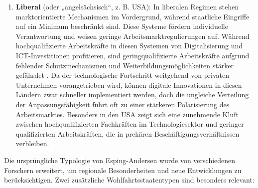 \begin{enumerate}
    \item \textbf{Liberal} (oder „angelsächsisch“, z. B. USA): In liberalen Regimen 
    stehen marktorientierte Mechanismen im Vordergrund, während staatliche Eingriffe auf ein 
    Minimum beschränkt sind. Diese Systeme fördern individuelle Verantwortung und weisen 
    geringe Arbeitsmarktregulierungen auf. Während hochqualifizierte Arbeitskräfte in diesen 
    Systemen von Digitalisierung und \ac{ICT}-Investitionen profitieren, sind 
    geringqualifizierte Arbeitskräfte aufgrund fehlender Schutzmechanismen und 
    Weiterbildungsmöglichkeiten stärker gefährdet \parencite[vgl.][S. 12–13]{goodin1999thereal}. 
    Da der technologische Fortschritt weitgehend von privaten Unternehmen vorangetrieben wird, 
    können digitale Innovationen in diesen Ländern zwar schneller implementiert werden, doch 
    die ungleiche Verteilung der Anpassungsfähigkeit führt oft zu einer stärkeren Polarisierung 
    des Arbeitsmarktes. Besonders in den USA zeigt sich eine zunehmende Kluft zwischen 
    hochqualifizierten Fachkräften im Technologiesektor und geringer qualifizierten Arbeitskräften, 
    die in prekären Beschäftigungsverhältnissen verbleiben.

\end{enumerate}

Die ursprüngliche Typologie von Esping-Andersen wurde von verschiedenen Forschern erweitert, 
um regionale Besonderheiten und neue Entwicklungen zu berücksichtigen. Zwei zusätzliche 
Wohlfahrtsstaatentypen sind besonders relevant:

